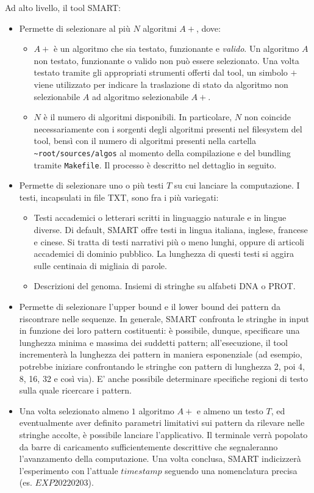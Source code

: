 Ad alto livello, il tool SMART:

\begin{itemize}
    \item Permette di selezionare al più $N$ algoritmi $A+$, dove:
    \begin{itemize}
        \item $A+$ è un algoritmo che sia testato, funzionante e \textit{valido}. Un algoritmo $A$ non testato, funzionante o valido non può essere selezionato. Una volta testato tramite gli appropriati strumenti offerti dal tool, un simbolo $+$ viene utilizzato per indicare la traslazione di stato da algoritmo non selezionabile $A$ ad algoritmo selezionabile $A+$.
        \item $N$ è il numero di algoritmi disponibili. In particolare, $N$ non coincide necessariamente con i sorgenti degli algoritmi presenti nel filesystem del tool, bensì con il numero di algoritmi presenti nella cartella \verb|~root/sources/algos| al momento della compilazione e del bundling tramite \verb|Makefile|. Il processo è descritto nel dettaglio in seguito.
    \end{itemize}
    \item Permette di selezionare uno o più testi $T$ su cui lanciare la computazione. I testi, incapsulati in file TXT, sono fra i più variegati:
    \begin{itemize}
        \item Testi accademici o letterari scritti in linguaggio naturale e in lingue diverse. Di default, SMART offre testi in lingua italiana, inglese, francese e cinese. Si tratta di testi narrativi più o meno lunghi, oppure di articoli accademici di dominio pubblico. La lunghezza di questi testi si aggira sulle centinaia di migliaia di parole.
        \item Descrizioni del genoma. Insiemi di stringhe su alfabeti DNA o PROT. 
    \end{itemize}
    \item Permette di selezionare l'upper bound e il lower bound dei pattern da riscontrare nelle sequenze. In generale, SMART confronta le stringhe in input in funzione dei loro pattern costituenti: è possibile, dunque, specificare una lunghezza minima e massima dei suddetti pattern; all'esecuzione, il tool incrementerà la lunghezza dei pattern in maniera esponenziale (ad esempio, potrebbe iniziare confrontando le stringhe con pattern di lunghezza 2, poi 4, 8, 16, 32 e così via). E' anche possibile determinare specifiche regioni di testo sulla quale ricercare i pattern.
    \item Una volta selezionato almeno $1$ algoritmo $A+$ e almeno un testo $T$, ed eventualmente aver definito parametri limitativi sui pattern da rilevare nelle stringhe accolte, è possibile lanciare l'applicativo. Il terminale verrà popolato da barre di caricamento sufficientemente descrittive che segnaleranno l'avanzamento della computazione. Una volta conclusa, SMART indicizzerà l'esperimento con l'attuale $timestamp$ seguendo una nomenclatura precisa (es. $EXP20220203$). 
    

\end{itemize}
